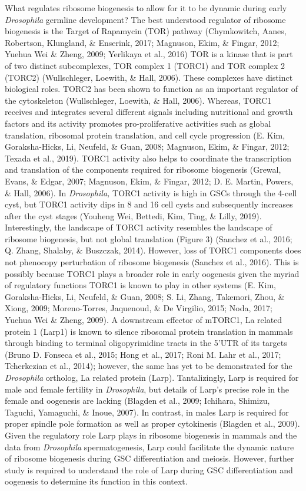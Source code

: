 \documentclass[12pt,oneside]{reedthesis}
\begin{document}
What regulates ribosome biogenesis to allow for it to be dynamic during
early \emph{Drosophila} germline development? The best understood regulator
of ribosome biogenesis is the Target of Rapamycin (TOR) pathway
(Chymkowitch, Aanes, Robertson, Klungland, \& Enserink, 2017; Magnuson, Ekim, \& Fingar, 2012; Yuehua Wei \& Zheng, 2009; Yerlikaya et al., 2016)
TOR is a kinase that is part of two distinct subcomplexes, TOR complex 1
(TORC1) and TOR complex 2 (TORC2) (Wullschleger, Loewith, \& Hall, 2006). These
complexes have distinct biological roles. TORC2 has been shown to
function as an important regulator of the cytoskeleton
(Wullschleger, Loewith, \& Hall, 2006). Whereas, TORC1 receives and integrates several
different signals including nutritional and growth factors and its
activity promotes pro-proliferative activities such as global
translation, ribosomal protein translation, and cell cycle progression
(E. Kim, Goraksha-Hicks, Li, Neufeld, \& Guan, 2008; Magnuson, Ekim, \& Fingar, 2012; Texada et al., 2019). TORC1 activity also helps
to coordinate the transcription and translation of the components
required for ribosome biogenesis (Grewal, Evans, \& Edgar, 2007; Magnuson, Ekim, \& Fingar, 2012; D. E. Martin, Powers, \& Hall, 2006). In \emph{Drosophila,} TORC1 activity is high in GSCs through
the 4-cell cyst, but TORC1 activity dips in 8 and 16 cell cysts and
subsequently increases after the cyst stages (Youheng Wei, Bettedi, Kim, Ting, \& Lilly, 2019).
Interestingly, the landscape of TORC1 activity resembles the landscape
of ribosome biogenesis, but not global translation (Figure 3)
(Sanchez et al., 2016; Q. Zhang, Shalaby, \& Buszczak, 2014). However, loss of TORC1 components does
not phenocopy perturbation of ribosome biogenesis (Sanchez et al., 2016).
This is possibly because TORC1 plays a broader role in early oogenesis
given the myriad of regulatory functions TORC1 is known to play in other
systems (E. Kim, Goraksha-Hicks, Li, Neufeld, \& Guan, 2008; S. Li, Zhang, Takemori, Zhou, \& Xiong, 2009; Moreno-Torres, Jaquenoud, \& De Virgilio, 2015; Noda, 2017; Yuehua Wei \& Zheng, 2009). A downstream effector of mTORC1, La related protein 1
(Larp1) is known to silence ribosomal protein translation in mammals
through binding to terminal oligopyrimidine tracts in the 5'UTR of its
targets (Bruno D. Fonseca et al., 2015; Hong et al., 2017; Roni M. Lahr et al., 2017; Tcherkezian et al., 2014); however, the same has yet to be
demonstrated for the \emph{Drosophila} ortholog, La related protein (Larp).
Tantalizingly, Larp is required for male and female fertility in
\emph{Drosophila}, but details of Larp's precise role in the female and
oogenesis are lacking (Blagden et al., 2009; Ichihara, Shimizu, Taguchi, Yamaguchi, \& Inoue, 2007). In contrast,
in males Larp is required for proper spindle pole formation as well as
proper cytokinesis (Blagden et al., 2009). Given the regulatory role Larp
plays in ribosome biogenesis in mammals and the data from \emph{Drosophila}
spermatogenesis, Larp could facilitate the dynamic nature of ribosome
biogenesis during GSC differentiation and meiosis. However, further
study is required to understand the role of Larp during GSC
differentiation and oogenesis to determine its function in this context.
\end{document}
